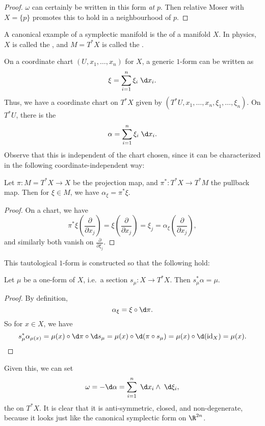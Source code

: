 \documentclass[a4paper]{article}
\begin{document}
\begin{proof}
  $\omega$ can certainly be written in this form \emph{at} $p$. Then relative Moser with $X = \{p\}$ promotes this to hold in a neighbourhood of $p$.
\end{proof}

A canonical example of a symplectic manifold is the  of a manifold $X$. In physics, $X$ is called the , and $M = T^*X$ is called the .

On a coordinate chart $(U, x_1, \ldots, x_n)$ for $X$, a generic $1$-form can be written as
\[
  \xi = \sum_{i = 1}^n \xi_i \;\d x_i.
\]
Thus, we have a coordinate chart on $T^*X$ given by $(T^* U, x_1, \ldots, x_n, \xi_1, \ldots, \xi_n)$. On $T^* U$, there is the 
\[
  \alpha = \sum_{i = 1}^n \xi_i \;\d x_i.
\]
Observe that this is independent of the chart chosen, since it can be characterized in the following coordinate-independent way:

\begin{prop}
  Let $\pi: M = T^*X \to X$ be the projection map, and $\pi^*: T^*X \to T^* M$ the pullback map. Then for $\xi \in M$, we have $\alpha_\xi = \pi^* \xi$.
\end{prop}

\begin{proof}
 On a chart, we have
 \[
   \pi^* \xi\left( \frac{\partial}{\partial x_j}\right) = \xi\left(\frac{\partial}{\partial x_j}\right) = \xi_j = \alpha_\xi \left(\frac{\partial}{\partial x_j}\right),
 \]
 and similarly both vanish on $\frac{\partial}{\partial \xi_j}$.
\end{proof}
This tautological $1$-form is constructed so that the following hold:
\begin{prop}
  Let $\mu$ be a one-form of $X$, i.e.\ a section $s_\mu: X \to T^* X$. Then $s_\mu^* \alpha = \mu$.
\end{prop}

\begin{proof}
  By definition,
  \[
    \alpha_\xi = \xi \circ \d \pi.
  \]
  So for $x \in X$, we have
  \[
    s_\mu^*\alpha_{\mu(x)} = \mu(x) \circ \d \pi \circ \d s_\mu = \mu(x) \circ \d (\pi \circ s_\mu) = \mu(x) \circ \d(\mathrm{id}_X) = \mu(x).\qedhere
  \]
\end{proof}

Given this, we can set
\[
  \omega = - \d \alpha = \sum_{i = 1}^n \;\d x_i \wedge \;\d \xi_i,
\]
the  on $T^* X$. It is clear that it is anti-symmetric, closed, and non-degenerate, because it looks just like the canonical symplectic form on $\R^{2n}$.
\end{document}

